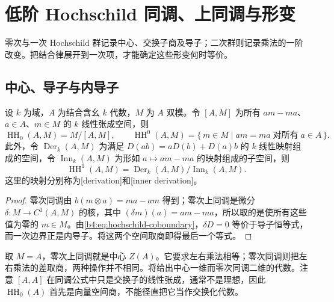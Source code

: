 
\section{低阶 Hochschild 同调、上同调与形变}
\label{b4:sec:1202}

零次与一次 Hochschild 群记录中心、交换子商及导子；二次群则记录乘法的一阶改变。把结合律展开到一次项，才能确定这些形变何时等价。

%
%

\subsection{中心、导子与内导子}
\label{b4:subsec:1202:01}

\begin{proposition}\label{b4:prop:hochschild-low-degrees}
	设 \(k\) 为域，\(A\) 为结合含幺 \(k\) 代数，\(M\) 为 \(A\) 双模。令 \([A,M]\) 为所有 \(am-ma\)、\(a\in A\)、\(m\in M\) 的 \(k\) 线性张成空间，则
	\[
		\operatorname{HH}_0(A,M)=M/[A,M],\qquad \operatorname{HH}^0(A,M)=\{\,m\in M\mid am=ma\;\text{对所有}\;a\in A\,\}.
	\]
	此外，令 \(\operatorname{Der}_k(A,M)\) 为满足 \(D(ab)=aD(b)+D(a)b\) 的 \(k\) 线性映射组成的空间，令 \(\operatorname{Inn}_k(A,M)\) 为形如 \(a\mapsto am-ma\) 的映射组成的子空间，则
	\[
		\operatorname{HH}^1(A,M) =\operatorname{Der}_k(A,M)/\operatorname{Inn}_k(A,M).
	\]
	这里的映射分别称为[derivation]和[inner derivation]。
\end{proposition}
\begin{proof}
	零次同调由 \(b(m\otimes a)=ma-am\) 得到；零次上同调是微分 \(\delta:M\to C^1(A,M)\) 的核，其中 \((\delta m)(a)=am-ma\)，所以取的是使所有这些值为零的 \(m\in M\)。由\eqref{b4:eq:hochschild-coboundary}，\(\delta D=0\) 等价于导子恒等式，而一次边界正是内导子。将这两个空间取商即得最后一个等式。
\end{proof}

取 \(M=A\)，零次上同调就是中心 \(Z(A)\)。它要求左右乘法相等；零次同调则把左右乘法的差取商，两种操作并不相同。将给出中心一维而零次同调二维的代数。注意 \([A,A]\) 在同调公式中只是交换子的线性张成，通常不是理想，因此 \(\operatorname{HH}_0(A)\) 首先是向量空间商，不能径直把它当作交换化代数。

